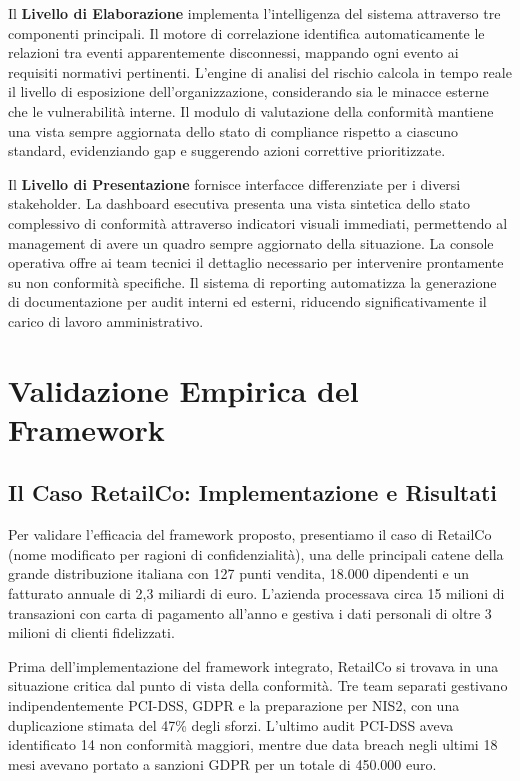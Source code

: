 Il \textbf{Livello di Elaborazione} implementa l'intelligenza del sistema attraverso tre componenti principali. Il motore di correlazione identifica automaticamente le relazioni tra eventi apparentemente disconnessi, mappando ogni evento ai requisiti normativi pertinenti. L'engine di analisi del rischio calcola in tempo reale il livello di esposizione dell'organizzazione, considerando sia le minacce esterne che le vulnerabilità interne. Il modulo di valutazione della conformità mantiene una vista sempre aggiornata dello stato di compliance rispetto a ciascuno standard, evidenziando gap e suggerendo azioni correttive prioritizzate.

Il \textbf{Livello di Presentazione} fornisce interfacce differenziate per i diversi stakeholder. La dashboard esecutiva presenta una vista sintetica dello stato complessivo di conformità attraverso indicatori visuali immediati, permettendo al management di avere un quadro sempre aggiornato della situazione. La console operativa offre ai team tecnici il dettaglio necessario per intervenire prontamente su non conformità specifiche. Il sistema di reporting automatizza la generazione di documentazione per audit interni ed esterni, riducendo significativamente il carico di lavoro amministrativo.

\section{\texorpdfstring{Validazione Empirica del Framework}{4.4 - Validazione Empirica del Framework}}
\label{sec:4.4_validazione}

\subsection{\texorpdfstring{Il Caso RetailCo: Implementazione e Risultati}{4.4.1 - Il Caso RetailCo: Implementazione e Risultati}}
\label{subsec:4.4.1_retailco}

Per validare l'efficacia del framework proposto, presentiamo il caso di RetailCo (nome modificato per ragioni di confidenzialità), una delle principali catene della grande distribuzione italiana con 127 punti vendita, 18.000 dipendenti e un fatturato annuale di 2,3 miliardi di euro. L'azienda processava circa 15 milioni di transazioni con carta di pagamento all'anno e gestiva i dati personali di oltre 3 milioni di clienti fidelizzati.

Prima dell'implementazione del framework integrato, RetailCo si trovava in una situazione critica dal punto di vista della conformità. Tre team separati gestivano indipendentemente PCI-DSS, GDPR e la preparazione per NIS2, con una duplicazione stimata del 47\% degli sforzi. L'ultimo audit PCI-DSS aveva identificato 14 non conformità maggiori, mentre due data breach negli ultimi 18 mesi avevano portato a sanzioni GDPR per un totale di 450.000 euro.

